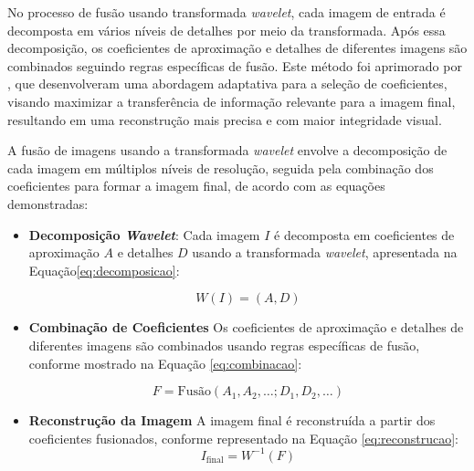 No processo de fusão usando transformada \textit{wavelet}, cada imagem de entrada é decomposta em vários níveis de detalhes por meio da transformada. Após essa decomposição, os coeficientes de aproximação e detalhes de diferentes imagens são combinados seguindo regras específicas de fusão. Este método foi aprimorado por , que desenvolveram uma abordagem adaptativa para a seleção de coeficientes, visando maximizar a transferência de informação relevante para a imagem final, resultando em uma reconstrução mais precisa e com maior integridade visual.

A fusão de imagens usando a transformada \textit{wavelet} envolve a decomposição de cada imagem em múltiplos níveis de resolução, seguida pela combinação dos coeficientes para formar a imagem final, de acordo com as equações demonstradas:
\begin{itemize}
    \item \textbf{Decomposição \textit{Wavelet}}:
    Cada imagem \( I \) é decomposta em coeficientes de aproximação \( A \) e detalhes \( D \) usando a transformada \textit{wavelet}, apresentada na 
Equação\ref{eq:decomposicao}:

\begin{equation}
W(I) = (A, D)
\label{eq:decomposicao}
\end{equation}
\end{itemize}

\begin{itemize}
\item{\textbf{Combinação de Coeficientes}}
Os coeficientes de aproximação e detalhes de diferentes imagens são combinados usando regras específicas de fusão, conforme mostrado na Equação \ref{eq:combinacao}:

\begin{equation}
F = \text{Fusão}(A_1, A_2, \ldots; D_1, D_2, \ldots)
\label{eq:combinacao}
\end{equation}

\end{itemize}

\begin{itemize}
\item{\textbf{Reconstrução da Imagem}}
A imagem final é reconstruída a partir dos coeficientes fusionados, conforme representado na Equação \ref{eq:reconstrucao}:
\begin{equation}
   I_{\text{final}} = W^{-1}(F)
   \label{eq:reconstrucao}
\end{equation}

\end{itemize}

